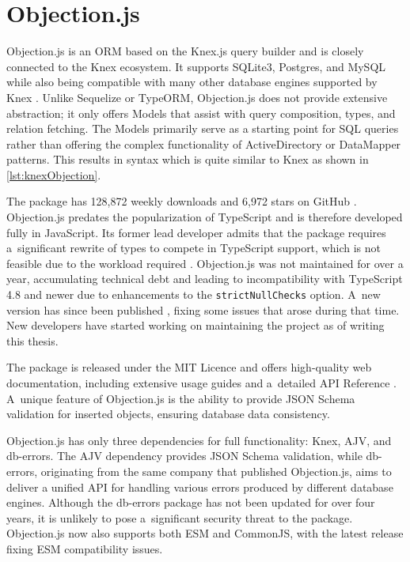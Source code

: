 \section{Objection.js}
Objection.js is an ORM based on the Knex.js query builder and is closely
connected to the Knex ecosystem. It supports SQLite3, Postgres, and MySQL while
also being compatible with many other database engines supported by Knex
\cite{objectionGitHub}. Unlike Sequelize or TypeORM, Objection.js does not
provide extensive abstraction; it only offers Models that assist with query
composition, types, and relation fetching. The Models primarily serve as a
starting point for SQL queries rather than offering the complex functionality of
ActiveDirectory or DataMapper patterns. This results in syntax which is quite
similar to Knex as shown in \autoref{lst:knexObjection}.

The package has 128,872 weekly downloads \cite{objectionNpm} and 6,972 stars on
GitHub \cite{objectionGitHub}. Objection.js predates the popularization of
TypeScript and is therefore developed fully in JavaScript. Its former lead
developer admits that the package requires a~significant rewrite of types to
compete in TypeScript support, which is not feasible due to the workload
required \cite{objectionFuture}. Objection.js was not maintained for over a
year, accumulating technical debt and leading to incompatibility with TypeScript
4.8 and newer due to enhancements to the \texttt{strictNullChecks} option. A~new
version has since been published \cite{objection302}, fixing some issues that
arose during that time. New developers have started working on maintaining the
project as of writing this thesis.

The package is released under the MIT Licence and offers high-quality web
documentation, including extensive usage guides and a~detailed API Reference
\cite{objectionDocs}. A~unique feature of Objection.js is the ability to provide
JSON Schema validation for inserted objects, ensuring database data consistency.

Objection.js has only three dependencies for full functionality: Knex, AJV, and
db-errors. The AJV dependency provides JSON Schema validation, while db-errors,
originating from the same company that published Objection.js, aims to deliver a
unified API for handling various errors produced by different database engines.
Although the db-errors package has not been updated for over four years, it is
unlikely to pose a~significant security threat to the package. Objection.js now
also supports both ESM and CommonJS, with the latest release fixing ESM
compatibility issues.

